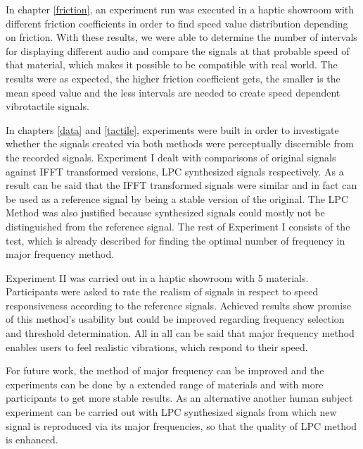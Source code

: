 In chapter \ref{friction}, an experiment run was executed in a haptic showroom with different friction coefficients in order to find speed value distribution depending on friction. With these results, we were able to determine the number of intervals for displaying different audio and compare the signals at that probable speed of that material, which makes it possible to be compatible with real world. The results were as expected, the higher friction coefficient gets, the smaller is the mean speed value and the less intervals are needed to create speed dependent vibrotactile signals.

In chapters \ref{data} and \ref{tactile}, experiments were built in order to investigate whether the signals created via both methods were perceptually discernible from the recorded signals. Experiment I dealt with comparisons of original signals against IFFT transformed versions, LPC synthesized signals respectively. As a result can be said that the IFFT transformed signals were similar and in fact can be used as a reference signal by being a stable version of the original. The LPC Method was also justified because synthesized signals could mostly not be distinguished from the reference signal. The rest of Experiment I consists of the test, which is already described for finding the optimal number of frequency in major frequency method. 

Experiment II was carried out in a haptic showroom with 5 materials. Participants were asked to rate the realism of signals in respect to speed responsiveness according to the reference signals. Achieved results show promise of this method's usability but could be improved regarding frequency selection and threshold determination. All in all can be said that major frequency method enables users to feel realistic vibrations, which respond to their speed.

For future work, the method of major frequency can be improved and the experiments can be done by a extended range of materials and with more participants to get more stable results. As an alternative another human subject experiment can be carried out with LPC synthesized signals from which new signal is reproduced via its major frequencies, so that the quality of LPC method is enhanced.  







